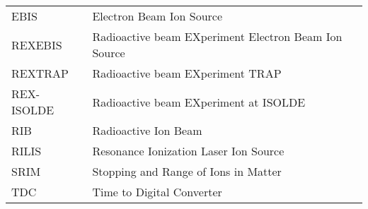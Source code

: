 \begin{tabular}{ll}
    EBIS        &  Electron Beam Ion Source                                   \\
    REXEBIS     &  Radioactive beam EXperiment Electron Beam Ion Source       \\
    REXTRAP     &  Radioactive beam EXperiment TRAP                           \\
    REX-ISOLDE  &  Radioactive beam EXperiment at ISOLDE                      \\
    RIB         &  Radioactive Ion Beam                                       \\
    RILIS       &  Resonance Ionization Laser Ion Source                      \\
    SRIM        &  Stopping and Range of Ions in Matter                       \\
    TDC         &  Time to Digital Converter                                  \\
    \hline
\end{tabular}
\label{tab:acro}
